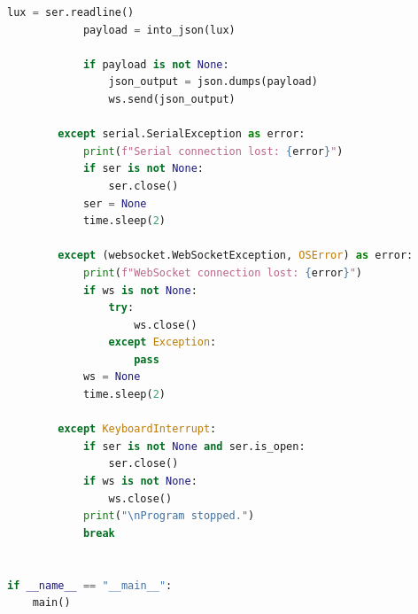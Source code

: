 \documentclass[11pt]{article}
\begin{document}
\begin{lstlisting}[language=Python]
            lux = ser.readline()
            payload = into_json(lux)

            if payload is not None:
                json_output = json.dumps(payload)
                ws.send(json_output)

        except serial.SerialException as error:
            print(f"Serial connection lost: {error}")
            if ser is not None:
                ser.close()
            ser = None
            time.sleep(2)

        except (websocket.WebSocketException, OSError) as error:
            print(f"WebSocket connection lost: {error}")
            if ws is not None:
                try:
                    ws.close()
                except Exception:   
                    pass
            ws = None
            time.sleep(2)

        except KeyboardInterrupt:
            if ser is not None and ser.is_open:
                ser.close()
            if ws is not None:
                ws.close()
            print("\nProgram stopped.")
            break


if __name__ == "__main__":
    main()

    \end{lstlisting}
\end{document}
